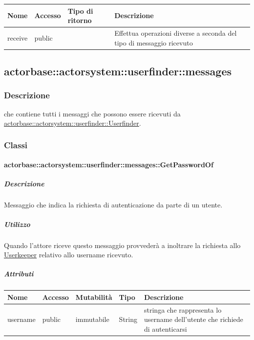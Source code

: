 \documentclass{scalatekids-article}
\begin{document}
\begin{tabular}{| l | l | l | l |}
  \hline
  Nome & Accesso & Tipo di ritorno & Descrizione\\
  \hline
  receive & public &  & Effettua operazioni diverse a seconda del tipo di messaggio ricevuto\\
  \hline
\end{tabular}

\subsection{actorbase::actorsystem::userfinder::messages}
\label{sec:actorbase::actorsystem::userfinder::messages}

\subsubsection{Descrizione}
 che contiene tutti i messaggi che possono essere ricevuti da
\hyperref[sec:actorbase::actorsystem::userfinder::Userfinder]{actorbase::actorsystem::userfinder::Userfinder}.

\subsubsection{Classi}

\paragraph{actorbase::actorsystem::userfinder::messages::GetPasswordOf}
\label{sec:actorbase::actorsystem::userfinder::messages::GetPasswordOf}

\subparagraph{Descrizione}
Messaggio che indica la richiesta di autenticazione da parte di un utente.\\

\subparagraph{Utilizzo}
Quando l'attore riceve questo messaggio provvederà a inoltrare la richiesta
allo \hyperref[sec:actorbase::actorsystem::userkeeper::Userkeeper]{Userkeeper}
relativo allo username ricevuto.

\subparagraph{Attributi}
\begin{tabular}{| p{3cm} | p{1.5cm} | p{2cm} | p{2cm} | p{8.5cm} |}
  \hline
  Nome & Accesso & Mutabilità & Tipo & Descrizione\\
  \hline
  username & public & immutabile & String & stringa che rappresenta lo username dell'utente che richiede di autenticarsi\\
  \hline
\end{tabular}
\end{document}
